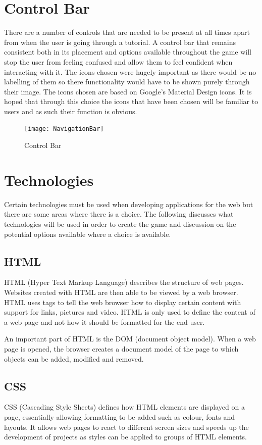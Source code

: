 \documentclass[12pt,a4paper]{report}
\begin{document}
\section{Control Bar}
There are a number of controls that are needed to be present at all times apart from when the user is going through a tutorial. A control bar that remains consistent both in its placement and options available throughout the game will stop the user from feeling confused and allow them to feel confident when interacting with it. The icons chosen were hugely important as there would be no labelling of them so there functionality would have to be shown purely through their image. The icons chosen are based on Google's Material Design icons. It is hoped that through this choice the icons that have been chosen will be familiar to users and as such their function is obvious.

\begin{figure}[h]
\centering
    \texttt{[image: NavigationBar]}
    \caption{Control Bar}
    \label{fig:floodFillBad}
\end{figure}
\FloatBarrier

\section{Technologies}
Certain technologies must be used when developing applications for the web but there are some areas where there is a choice. The following discusses what technologies will be used in order to create the game and discussion on the potential options available where a choice is available. 

\subsection{HTML}
HTML (Hyper Text Markup Language) describes the structure of web pages. Websites created with HTML are then able to be viewed by a web browser. HTML uses tags to tell the web browser how to display certain content with support for links, pictures and video. HTML is only used to define the content of a web page and not how it should be formatted for the end user.

An important part of HTML is the DOM (document object model). When a web page is opened, the browser creates a document model of the page to which objects can be added, modified and removed. 

\subsection{CSS}
CSS (Cascading Style Sheets) defines how HTML elements are displayed on a page, essentially allowing formatting to be added such as colour, fonts and layouts. It allows web pages to react to different screen sizes and speeds up the development of projects as styles can be applied to groups of HTML elements. 
\end{document}
